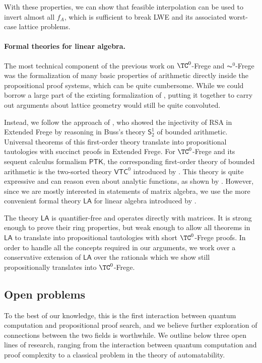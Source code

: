 \documentclass[11pt]{article}
\newcommand{\LA}{\mathsf{LA}}
\theoremstyle{definition}
\theoremstyle{plain}
\theoremstyle{remark}
\begin{document}
With these properties, we can show that feasible interpolation can be used to invert almost all $f_A$, which is sufficient to break LWE and its associated worst-case lattice problems.

\paragraph{Formal theories for linear algebra.}
The most technical component of the previous work on $\TC^0$-Frege and $\AC^0$-Frege was the formalization of many basic properties of arithmetic directly inside the propositional proof systems, which can be quite cumbersome. While we could borrow a large part of the existing formalization of \citeauthor{BPR1997} \cite{BPR1997}, putting it together to carry out arguments about lattice geometry would still be quite convoluted.

Instead, we follow the approach of \citeauthor{KP98}, who showed the injectivity of RSA in Extended Frege by reasoning in Buss's theory $\mathsf{S}^1_2$ of bounded arithmetic. Universal theorems of this first-order theory translate into propositional tautologies with succinct proofs in Extended Frege. For $\TC^0$-Frege and its sequent calculus formalism $\textsf{PTK}$, the corresponding first-order theory of bounded arithmetic is the two-sorted theory $\mathsf{VTC}^0$ introduced by \citeauthor{cookBOOK} \cite{cookBOOK}. This theory is quite expressive and can reason even about analytic functions, as shown by \citeauthor{jerabekVTC0} \cite{jerabekVTC0}. However, since we are mostly interested in statements of matrix algebra, we use the more convenient formal theory $\LA$ for linear algebra introduced by \citeauthor{cooksoltys} \cite{cooksoltys}.

The theory $\LA$ is quantifier-free and operates directly with matrices. It is strong enough to prove their ring properties, but weak enough to allow all theorems in $\LA$ to translate into propositional tautologies with short $\TC^0$-Frege proofs. In order to handle all the concepts required in our arguments, we work over a conservative extension of $\LA$ over the rationals which we show still propositionally translates into $\TC^0$-Frege.

\subsection*{Open problems}
To the best of our knowledge, this is the first interaction between quantum computation and propositional proof search, and we believe further exploration of connections between the two fields is worthwhile. We outline below three open lines of research, ranging from the interaction between quantum computation and proof complexity to a classical problem in the theory of automatability.
\end{document}
